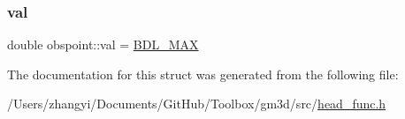 \subsubsection{\texorpdfstring{val}{val}}
{\footnotesize\ttfamily double obspoint\+::val = \mbox{\hyperlink{head__func_8h_a171f39ecf5d0b8067fd66e19e82f334d}{B\+D\+L\+\_\+\+M\+AX}}}



The documentation for this struct was generated from the following file\+:\begin{DoxyCompactItemize}
\item 
/\+Users/zhangyi/\+Documents/\+Git\+Hub/\+Toolbox/gm3d/src/\mbox{\hyperlink{head__func_8h}{head\+\_\+func.\+h}}\end{DoxyCompactItemize}
